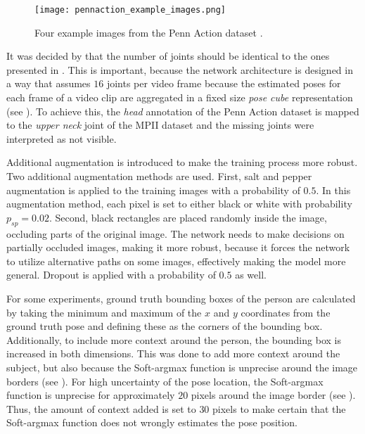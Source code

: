 \begin{figure}[htb!]
    \centering
    \texttt{[image: pennaction\_example\_images.png]}
    \caption{Four example images from the Penn Action dataset \cite{zhang_actemes_2013}. }
    \label{fig:pennaction_example_images}
\end{figure}

It was decided by \cite{luvizon_2d/3d_2018} that the number of joints should be identical to the ones presented in \cite{andriluka_2d_2014} .
This is important, because the network architecture is designed in a way that assumes $16$ joints per video frame because the estimated poses for each frame of a video clip are aggregated in a fixed size \textit{pose cube} representation (see ).
To achieve this, the \textit{head} annotation of the Penn Action dataset is mapped to the \textit{upper neck} joint of the MPII dataset and the missing joints were interpreted as not visible.

Additional augmentation is introduced to make the training process more robust.
Two additional augmentation methods are used.
First, salt and pepper augmentation is applied to the training images with a probability of $0.5$.
In this augmentation method, each pixel is set to either black or white with probability $p_{sp} = 0.02$.
Second, black rectangles are placed randomly inside the image, occluding parts of the original image.
The network needs to make decisions on partially occluded images, making it more robust, because it forces the network to utilize alternative paths on some images, effectively making the model more general.
Dropout is applied with a probability of $0.5$ as well.

For some experiments, ground truth bounding boxes of the person are calculated by taking the minimum and maximum of the $x$ and $y$ coordinates from the ground truth pose and defining these as the corners of the bounding box.
Additionally, to include more context around the person, the bounding box is increased in both dimensions.
This was done to add more context around the subject, but also because the Soft-argmax function is unprecise around the image borders (see ).
For high uncertainty of the pose location, the Soft-argmax function is unprecise for approximately $20$ pixels around the image border (see ).
Thus, the amount of context added is set to $30$ pixels to make certain that the Soft-argmax function does not wrongly estimates the pose position.


